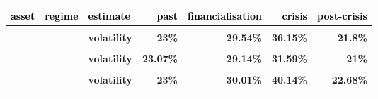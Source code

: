 \documentclass[
  authoryear,
  preprint,
  3p]{elsarticle}
\begin{document}
\begin{longtable}[t]{>{}l>{}l>{}l>{}r>{}r>{}r>{}r}
\toprule
\textcolor{black}{\textbf{asset}} & \textcolor{black}{\textbf{regime}} & \textcolor{black}{\textbf{estimate}} & \textcolor{black}{\textbf{past}} & \textcolor{black}{\textbf{financialisation}} & \textcolor{black}{\textbf{crisis}} & \textcolor{black}{\textbf{post-crisis}}\\
\midrule
\textbf{\cellcolor{gray!10}{Corn-\#2 yellow (XCBT)}} & \textbf{\cellcolor{gray!10}{whole period}} & \textbf{\cellcolor{gray!10}{mean}} & \textcolor[HTML]{4285f4}{\textbf{\cellcolor{gray!10}{3.48\%}}} & \textcolor[HTML]{4285f4}{\textbf{\cellcolor{gray!10}{21.37\%}}} & \textcolor[HTML]{4285f4}{\textbf{\cellcolor{gray!10}{6.89\%}}} & \textcolor[HTML]{4285f4}{\textbf{\cellcolor{gray!10}{-4.51\%}}}\\
\textbf{} & \textbf{} & \textbf{volatility} & \textcolor[HTML]{4285f4}{\textbf{23\%}} & \textcolor[HTML]{4285f4}{\textbf{29.54\%}} & \textcolor[HTML]{4285f4}{\textbf{36.15\%}} & \textcolor[HTML]{4285f4}{\textbf{21.8\%}}\\
\textbf{\cellcolor{gray!10}{}} & \textbf{\cellcolor{gray!10}{backwardation}} & \textbf{\cellcolor{gray!10}{mean}} & \textcolor[HTML]{4285f4}{\textbf{\cellcolor{gray!10}{-4.86\%}}} & \textcolor[HTML]{4285f4}{\textbf{\cellcolor{gray!10}{19.26\%}}} & \textcolor[HTML]{4285f4}{\textbf{\cellcolor{gray!10}{20.48\%}}} & \textcolor[HTML]{4285f4}{\textbf{\cellcolor{gray!10}{-8.74\%}}}\\
\textbf{} & \textbf{} & \textbf{volatility} & \textcolor[HTML]{4285f4}{\textbf{23.07\%}} & \textcolor[HTML]{4285f4}{\textbf{29.14\%}} & \textcolor[HTML]{4285f4}{\textbf{31.59\%}} & \textcolor[HTML]{4285f4}{\textbf{21\%}}\\
\textbf{\cellcolor{gray!10}{}} & \textbf{\cellcolor{gray!10}{contango}} & \textbf{\cellcolor{gray!10}{mean}} & \textcolor[HTML]{4285f4}{\textbf{\cellcolor{gray!10}{11.3\%}}} & \textcolor[HTML]{4285f4}{\textbf{\cellcolor{gray!10}{23.54\%}}} & \textcolor[HTML]{4285f4}{\textbf{\cellcolor{gray!10}{-4.43\%}}} & \textcolor[HTML]{4285f4}{\textbf{\cellcolor{gray!10}{0.78\%}}}\\
\addlinespace
\textbf{} & \textbf{} & \textbf{volatility} & \textcolor[HTML]{4285f4}{\textbf{23\%}} & \textcolor[HTML]{4285f4}{\textbf{30.01\%}} & \textcolor[HTML]{4285f4}{\textbf{40.14\%}} & \textcolor[HTML]{4285f4}{\textbf{22.68\%}}\\
\textbf{\cellcolor{gray!10}{Oats (XCBT)}} & \textbf{\cellcolor{gray!10}{whole period}} & \textbf{\cellcolor{gray!10}{mean}} & \textcolor[HTML]{4285f4}{\textbf{\cellcolor{gray!10}{5.49\%}}} & \textcolor[HTML]{4285f4}{\textbf{\cellcolor{gray!10}{21.62\%}}} & \textcolor[HTML]{4285f4}{\textbf{\cellcolor{gray!10}{8.89\%}}} & \textcolor[HTML]{4285f4}{\textbf{\cellcolor{gray!10}{-0.87\%}}}\\

\end{longtable}
\end{document}
